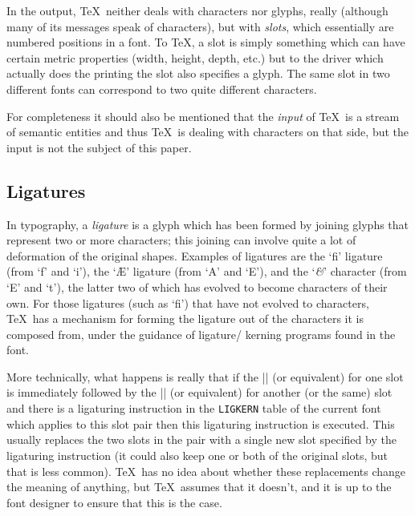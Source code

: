 \documentclass[a4paper]{article}
\begin{document}
In the output, \TeX\ neither deals with characters nor glyphs, really 
(although many of its messages speak of characters), but with 
\emph{slots}, which essentially are numbered positions in a font. To 
\TeX, a slot is simply something which can have certain metric 
properties (width, height, depth, etc.\@) but to the driver which 
actually does the printing the slot also specifies a glyph. The same 
slot in two different fonts can correspond to two quite different 
characters.

For completeness it should also be mentioned that the \emph{input} of 
\TeX\ is a stream of semantic entities and thus \TeX\ is dealing with 
characters on that side, but the input is not the subject of this 
paper.


\subsection{Ligatures}

In typography, a \emph{ligature} is a glyph which has been formed by 
joining glyphs that represent two or more characters; this joining can 
involve quite a lot of deformation of the original shapes. Examples 
of ligatures are the `fi' ligature (from `f' and `i'), the `\AE' 
ligature (from `A' and `E'), and the `\textit{\&}' character (from `E' 
and `t'), the latter two of which has evolved to become characters of 
their own. For those ligatures (such as `fi') that have not evolved to 
characters, \TeX\ has a mechanism for forming the ligature out of the 
characters it is composed from, under the guidance of ligature\slash 
kerning programs found in the font.

More technically, what happens is really that if the |\char| (or 
equivalent) for one slot is immediately followed by the |\char| (or 
equivalent) for another (or the same) slot and there is a ligaturing 
instruction in the \texttt{\small LIGKERN} table of the current font 
which applies to this slot pair then this ligaturing instruction is 
executed. This usually replaces the two slots in the pair with a 
single new slot specified by the ligaturing instruction (it could 
also keep one or both of the original slots, but that is less common). 
\TeX\ has no idea about whether these replacements change the meaning 
of anything, but \TeX\ assumes that it doesn't, and it is up to the 
font designer to ensure that this is the case.
\end{document}
